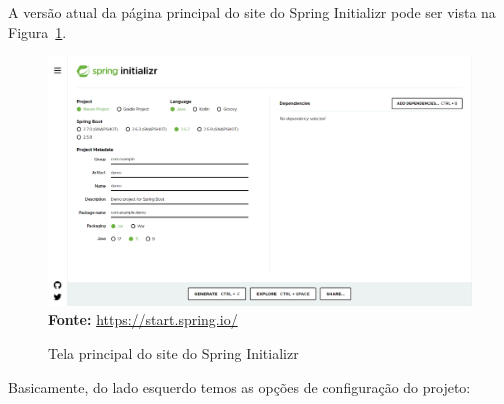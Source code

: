 A versão atual da página principal do site do Spring Initializr pode ser vista na Figura~\ref{fig:cap10SpringInitializr}.

\FloatBarrier
\begin{figure}[!htbp]
    \centering
    \caption{Tela principal do site do Spring Initializr}
    \includegraphics[scale=0.4]{imagens/cap10SpringInitializr}
    \\\textbf{Fonte:} \url{https://start.spring.io/}
    \label{fig:cap10SpringInitializr}
\end{figure}
\FloatBarrier

Basicamente, do lado esquerdo temos as opções de configuração do projeto:

